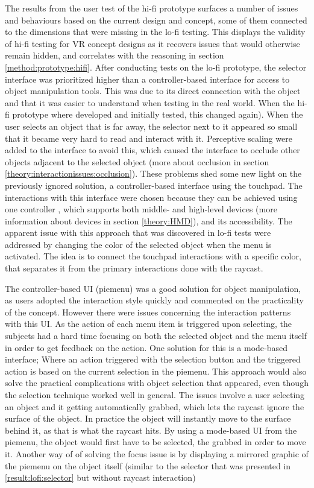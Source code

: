 The results from the user test of the hi-fi prototype surfaces a number of issues and behaviours based on the current design and concept, some of them connected to the dimensions that were missing in the lo-fi testing. This displays the validity of hi-fi testing for VR concept designs as it recovers issues that would otherwise remain hidden, and correlates with the reasoning in section \ref{method:prototype:hifi}. After conducting tests on the lo-fi prototype, the selector interface was prioritized higher than a controller-based interface for access to object manipulation tools. This was due to its direct connection with the object and that it was easier to understand when testing in the real world. When the hi-fi prototype where developed and initially tested, this changed again). When the user selects an object that is far away, the selector next to it appeared so small that it became very hard to read and interact with it. Perceptive scaling were added to the interface to avoid this, which caused the interface to occlude other objects adjacent to the selected object (more about occlusion in section \ref{theory:interactionissues:occlusion}). These problems shed some new light on the previously ignored solution, a controller-based interface using the touchpad. The interactions with this interface were chosen because they can be achieved using one controller , which supports both middle- and high-level devices (more information about devices in section \ref{theory:HMD}), and its accessibility. The apparent issue with this approach that was discovered in lo-fi tests were addressed by changing the color of the selected object when the menu is activated. The idea is to connect the touchpad interactions with a specific color, that separates it from the primary interactions done with the raycast.

The controller-based UI (piemenu) was a good solution for object manipulation, as users adopted the interaction style quickly and commented on the practicality of the concept. However there were issues concerning the interaction patterns with this UI. As the action of each menu item is triggered upon selecting, the subjects had a hard time focusing on both the selected object and the menu itself in order to get feedback on the action. One solution for this is a mode-based interface; Where an action triggered with the selection button and the triggered action is based on the current selection in the piemenu. This approach would also solve the practical complications with object selection that appeared, even though the selection technique worked well in general. The issues involve a user selecting an object and it getting automatically grabbed, which lets the raycast ignore the surface of the object. In practice the object will instantly move to the surface behind it, as that is what the raycast hits. By using a mode-based UI from the piemenu, the object would first have to be selected, the grabbed in order to move it. Another way of of solving the focus issue is by displaying a mirrored graphic of the piemenu on the object itself (similar to the selector that was presented in \ref{result:lofi:selector} but without raycast interaction)

